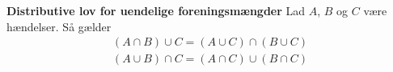 \section{}\label{Distributive love}
\begin{minipage}\textwidth
\begin{lem} \textbf{Distributive lov for uendelige foreningsmængder} %
\newline
Lad $A$, $B$ og $C$ være hændelser. Så gælder
    \begin{align*}
        (A\cap B)\cup C=(A\cup C)\cap(B\cup C)\\
        (A\cup B)\cap C=(A\cap C)\cup(B\cap C)
    \end{align*}
\end{lem}
\end{minipage}